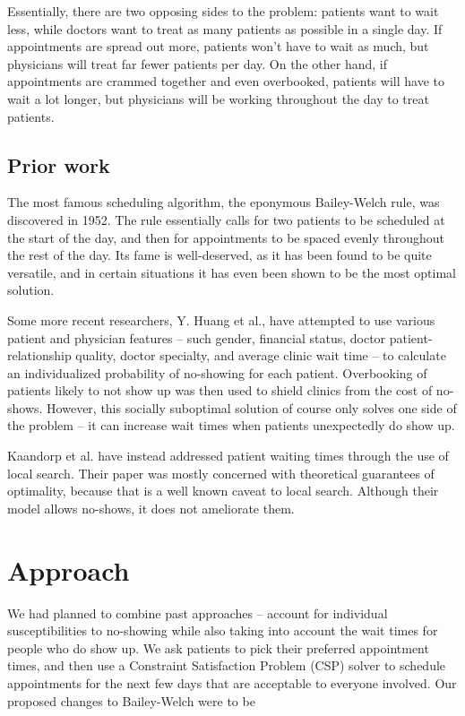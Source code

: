 \documentclass{article} %
\begin{document}
Essentially, there are two opposing sides to the problem: patients want to wait less, while doctors want to treat as many patients as possible in a single day.\cite{koeleman2012} If appointments are spread out more, patients won't have to wait as much, but physicians will treat far fewer patients per day. On the other hand, if appointments are crammed together and even overbooked, patients will have to wait a lot longer, but physicians will be working throughout the day to treat patients.


\subsection{Prior work}

The most famous scheduling algorithm, the eponymous Bailey-Welch rule, was discovered in 1952. The rule essentially calls for two patients to be scheduled at the start of the day, and then for appointments to be spaced evenly throughout the rest of the day.\cite{welch1952} Its fame is well-deserved, as it has been found to be quite versatile, and in certain situations it has even been shown to be the most optimal solution.\cite{kaandorp2007}

Some more recent researchers, Y. Huang et al., have attempted to use various patient and physician features -- such gender, financial status, doctor patient-relationship quality, doctor specialty, and average clinic wait time -- to calculate an individualized probability of no-showing for each patient. Overbooking of patients likely to not show up was then used to shield clinics from the cost of no-shows. However, this socially suboptimal solution of course only solves one side of the problem -- it can increase wait times when patients unexpectedly do show up.\cite{huang2012}

Kaandorp et al. have instead addressed patient waiting times through the use of local search. Their paper was mostly concerned with theoretical guarantees of optimality, because that is a well known caveat to local search. Although their model allows no-shows, it does not ameliorate them.\cite{kaandorp2007}

\section{Approach}

We had planned to combine past approaches -- account for individual susceptibilities to no-showing while also taking into account the wait times for people who do show up. We ask patients to pick their preferred appointment times, and then use a Constraint Satisfaction Problem (CSP) solver to schedule appointments for the next few days that are acceptable to everyone involved. Our proposed changes to Bailey-Welch were to be
\end{document}
